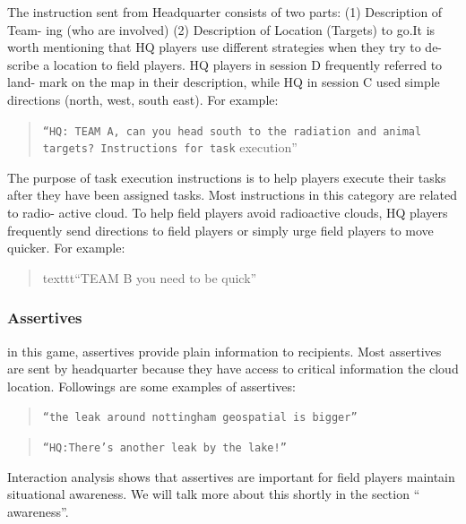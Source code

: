 The instruction sent from Headquarter consists of two parts: (1) Description of Team- ing (who are involved) (2) Description of Location (Targets) to go.It is worth mentioning that HQ players use different strategies when they try to de- scribe a location to field players. HQ players in session D frequently referred to land- mark on the map in their description, while HQ in session C used simple directions (north, west, south east). For example:\\

\begin{quote}
\texttt{``HQ: TEAM A, can you head south to the radiation and animal targets? Instructions for task} execution''\\
\end{quote}

The purpose of task execution instructions is to help players execute their tasks after they have been assigned tasks. Most instructions in this category are related to radio- active cloud. To help field players avoid radioactive clouds, HQ players frequently send directions to field players or simply urge field players to move quicker. For example:

\begin{quote}
texttt{``TEAM B you need to be quick''} \\
\end{quote}

\subsubsection{Assertives}

in this game, assertives provide plain information to recipients. Most assertives are sent by headquarter because they have access to critical information the cloud location. Followings are some examples of assertives:\\

\begin{quote}
\texttt{``the leak around nottingham geospatial is bigger''}\\
\end{quote}

\begin{quote}
\texttt{``HQ:There's another leak by the lake!''}\\
\end{quote}

Interaction analysis shows that assertives are important for field players maintain situational awareness. We will talk more about this shortly in the section `` awareness''.\\


